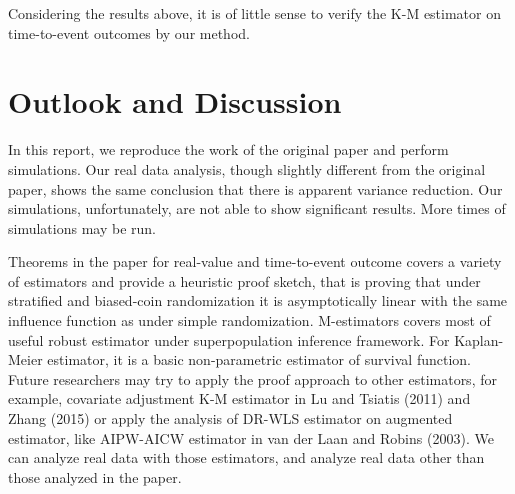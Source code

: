 \documentclass{article}
\begin{document}
\leavevmode\newline
{}
\leavevmode\newline

Considering the results above, it is of little sense to verify the K-M estimator on time-to-event outcomes by our method.

\section{Outlook and Discussion}

In this report, we reproduce the work of the original paper and perform simulations. Our real data analysis, though slightly different from the original paper, shows the same conclusion that there is apparent variance reduction. Our simulations, unfortunately, are not able to show significant results. More times of simulations may be run. 

Theorems in the paper for real-value and time-to-event outcome covers a variety of estimators and provide a heuristic proof sketch, that is proving that under stratified and biased-coin randomization
it is asymptotically linear with the same influence function as
under simple randomization. M-estimators covers most of useful robust estimator under superpopulation inference framework. For Kaplan-Meier estimator, it is a basic non-parametric estimator of survival function. Future researchers may try to apply the proof approach to other estimators, for example, covariate adjustment K-M estimator in Lu and Tsiatis (2011)\cite{coKMlu2011semiparametric} and Zhang (2015)\cite{coKMzhang2015robust} or apply the analysis of DR-WLS estimator on augmented estimator, like AIPW-AICW estimator in van der Laan and Robins (2003)\cite{van2003unified}. We can analyze real data with those estimators, and analyze real data other than those analyzed in the paper.



\end{document}
